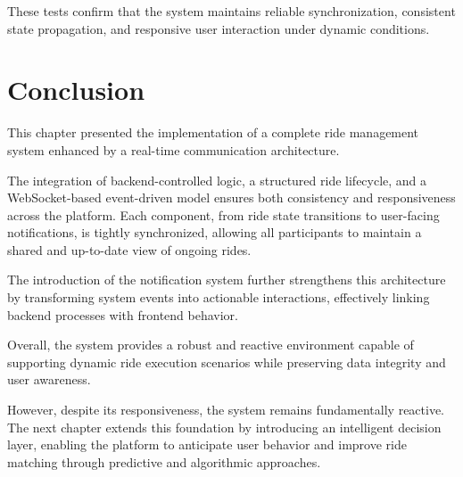 These tests confirm that the system maintains reliable synchronization, consistent state propagation, and responsive user interaction under dynamic conditions.

\section{Conclusion}

This chapter presented the implementation of a complete ride management system enhanced by a real-time communication architecture.

The integration of backend-controlled logic, a structured ride lifecycle, and a WebSocket-based event-driven model ensures both consistency and responsiveness across the platform. Each component, from ride state transitions to user-facing notifications, is tightly synchronized, allowing all participants to maintain a shared and up-to-date view of ongoing rides.

The introduction of the notification system further strengthens this architecture by transforming system events into actionable interactions, effectively linking backend processes with frontend behavior.

Overall, the system provides a robust and reactive environment capable of supporting dynamic ride execution scenarios while preserving data integrity and user awareness.

However, despite its responsiveness, the system remains fundamentally reactive. The next chapter extends this foundation by introducing an intelligent decision layer, enabling the platform to anticipate user behavior and improve ride matching through predictive and algorithmic approaches.